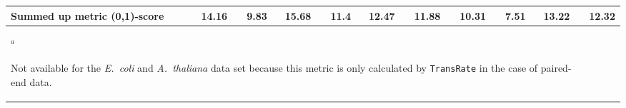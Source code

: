 \documentclass{scrartcl}
\begin{document}
\begin{landscape}
\begin{table}
\begin{scriptsize}
\begin{tabular}{llllllllllll}
\multicolumn{2}{l}{\textbf{Summed up metric (0,1)-score}}&14.16&9.83&15.68&11.4&12.47&11.88&10.31&7.51&13.22&12.32\\\bottomrule
\multicolumn{11}{l}{$^{a}$\begin{scriptsize}Not available for the \emph{E.~coli} and \emph{A.~thaliana} data set because this metric is only calculated by \texttt{TransRate} in the case of paired-end data.\end{scriptsize}}\\\end{tabular}\end{scriptsize}
\end{table}
\end{landscape}
\end{document}
